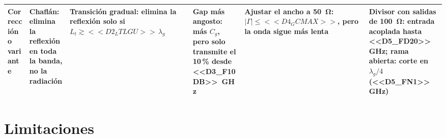 \documentclass[11pt,letterpaper]{article}
\begin{document}
\begin{table}
\begin{tabular}{P{2.1cm}P{3.7cm}P{3.7cm}P{3.7cm}P{3.7cm}P{4.2cm}}
Corrección o variante & Chaflán: elimina la reflexión en toda la banda, no la radiación & Transición gradual: elimina la reflexión solo si $L_t\gtrsim<<D2_LTLGU>>\,\lambda_g$ & Gap más angosto: más $C_g$, pero solo transmite el 10\,\% desde \SI{<<D3_F10DB>>}{GHz} & Ajustar el ancho a \SI{50}{\ohm}: $|\Gamma|\leq <<D4_GCMAX>>$, pero la onda sigue más lenta & Divisor con salidas de \SI{100}{\ohm}: entrada acoplada hasta \SI{<<D5_FD20>>}{GHz}; rama abierta: corte en $\lambda_g/4$ (\SI{<<D5_FN1>>}{GHz}) \\
\bottomrule
\end{tabular}
\end{table}

\section{Limitaciones}
\end{document}
